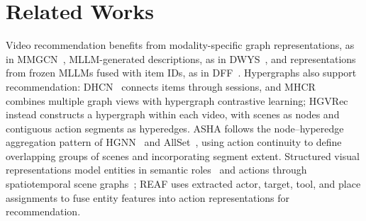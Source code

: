 \section{Related Works}
\label{sec:related_works}
Video recommendation benefits from modality-specific graph representations, as in MMGCN~\cite{wei2019mmgcn}, MLLM-generated descriptions, as in DWYS~\cite{denadai2025dwys}, and representations from frozen MLLMs fused with item IDs, as in DFF~\cite{sun2026dff}.
Hypergraphs also support recommendation: DHCN~\cite{xia2021dhcn} connects items through sessions, and MHCR~\cite{lyu2025mhcr} combines multiple graph views with hypergraph contrastive learning; HGVRec instead constructs a hypergraph within each video, with scenes as nodes and contiguous action segments as hyperedges.
ASHA follows the node--hyperedge aggregation pattern of HGNN~\cite{feng2019hgnn} and AllSet~\cite{chien2022allset}, using action continuity to define overlapping groups of scenes and incorporating segment extent.
Structured visual representations model entities in semantic roles~\cite{pratt2020gsr} and actions through spatiotemporal scene graphs~\cite{ji2020actiongenome}; REAF uses extracted actor, target, tool, and place assignments to fuse entity features into action representations for recommendation.
